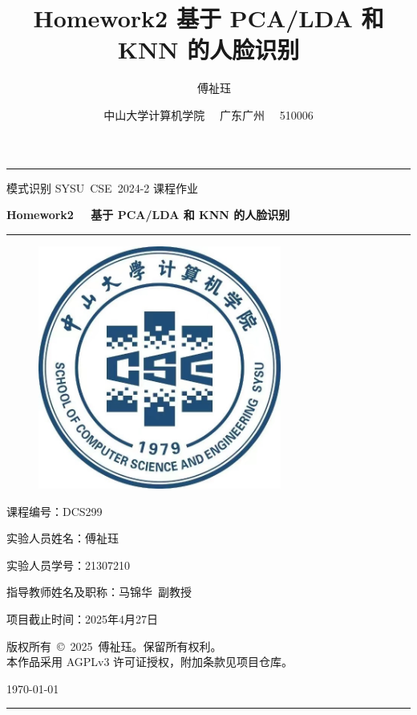 \documentclass[a4paper, utf8]{ctexart}
\title{\songti \Large \textbf{Homework2 \quad 基于 PCA/LDA 和 KNN 的人脸识别}}
\author{\fangsong 21307210 \ \  傅祉珏}
\date{\fangsong 中山大学计算机学院 \ \  广东广州 \ \  510006}
\renewcommand*{\songti}{\CJKfamily{zhsong}}
\begin{document}
	\begin{titlepage}
		\centering
		\rule{\textwidth}{1pt}
		\vspace{0.02\textheight}
		
		{\LARGE \kaishu 模式识别 \quad SYSU\ CSE\ 2024-2 \quad 课程作业}
		
		\vspace{0.02\textheight}
		
		{\Huge \songti \bfseries Homework2 \ \  基于 PCA/LDA 和 KNN 的人脸识别}
		
		\vspace{0.025\textheight}
		\rule{0.83\textwidth}{0.4pt}
		\vspace{0.025\textheight}
		\begin{figure}[htbp]
			\centering
			\includegraphics[width=8cm, height=8cm]{./figure/计院院徽.jpg}
		\end{figure}
		
		\vspace{0.035\textheight} 
		{\Large 课程编号：\textsc{DCS299}}
		
		\vspace{0.025\textheight} 
		{\Large 实验人员姓名：\textsc{傅祉珏}}
		
		\vspace{0.025\textheight} 
		{\Large 实验人员学号：\textsc{21307210}}
		
		\vspace{0.025\textheight} 
		{\Large 指导教师姓名及职称：\textsc{马锦华\ 副教授}}
		
		\vspace{0.025\textheight} 
		{\Large 项目截止时间：\textsc{2025年4月27日}}
		
		\vspace{0.025\textheight} 
		{\small \kaishu 版权所有\ \copyright\ 2025\ 傅祉珏。保留所有权利。\\
		本作品采用 AGPLv3 许可证授权，附加条款见项目仓库。}
		
		\vspace{0.025\textheight} 
		{\large \today}
		\vspace{0.1\textheight}
		\rule{\textwidth}{1pt}
	\end{titlepage}
	\let\cleardoublepage\clearpage
	
\end{document}
